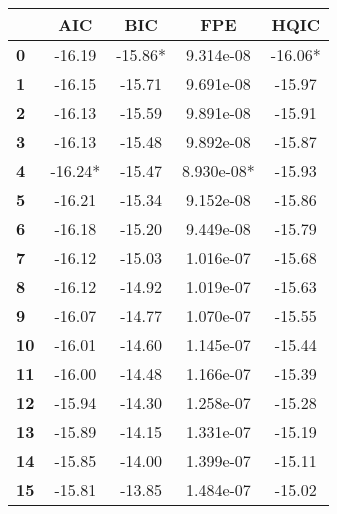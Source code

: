 \begin{center}
\begin{tabular}{lcccc}
\toprule
            & \textbf{AIC} & \textbf{BIC} & \textbf{FPE} & \textbf{HQIC}  \\
\midrule
\textbf{0}  &      -16.19  &     -15.86*  &   9.314e-08  &      -16.06*   \\
\textbf{1}  &      -16.15  &      -15.71  &   9.691e-08  &       -15.97   \\
\textbf{2}  &      -16.13  &      -15.59  &   9.891e-08  &       -15.91   \\
\textbf{3}  &      -16.13  &      -15.48  &   9.892e-08  &       -15.87   \\
\textbf{4}  &     -16.24*  &      -15.47  &  8.930e-08*  &       -15.93   \\
\textbf{5}  &      -16.21  &      -15.34  &   9.152e-08  &       -15.86   \\
\textbf{6}  &      -16.18  &      -15.20  &   9.449e-08  &       -15.79   \\
\textbf{7}  &      -16.12  &      -15.03  &   1.016e-07  &       -15.68   \\
\textbf{8}  &      -16.12  &      -14.92  &   1.019e-07  &       -15.63   \\
\textbf{9}  &      -16.07  &      -14.77  &   1.070e-07  &       -15.55   \\
\textbf{10} &      -16.01  &      -14.60  &   1.145e-07  &       -15.44   \\
\textbf{11} &      -16.00  &      -14.48  &   1.166e-07  &       -15.39   \\
\textbf{12} &      -15.94  &      -14.30  &   1.258e-07  &       -15.28   \\
\textbf{13} &      -15.89  &      -14.15  &   1.331e-07  &       -15.19   \\
\textbf{14} &      -15.85  &      -14.00  &   1.399e-07  &       -15.11   \\
\textbf{15} &      -15.81  &      -13.85  &   1.484e-07  &       -15.02   \\
\bottomrule
\end{tabular}
\end{center}